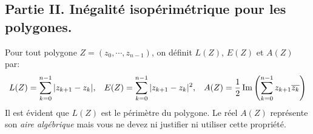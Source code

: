 \subsection*{Partie II. Inégalité isopérimétrique pour les polygones.}
Pour tout polygone $Z=(z_0,\cdots,z_{n-1})$, on définit $L(Z)$, $E(Z)$ et $A(Z)$ par:
\begin{displaymath}
 L(Z) = \sum_{k=0}^{n-1}|z_{k+1}-z_k|, \hspace{0.3cm}
 E(Z) = \sum_{k=0}^{n-1}|z_{k+1}-z_k|^2, \hspace{0.3cm}
 A(Z) = \frac{1}{2}\Im\left( \sum_{k=0}^{n-1}z_{k+1}\overline{z_k}\right) 
\end{displaymath}
Il est évident que $L(Z)$ est le périmètre du polygone. Le réel $A(Z)$ représente son \emph{aire algébrique} mais vous ne devez ni justifier ni utiliser cette propriété.
